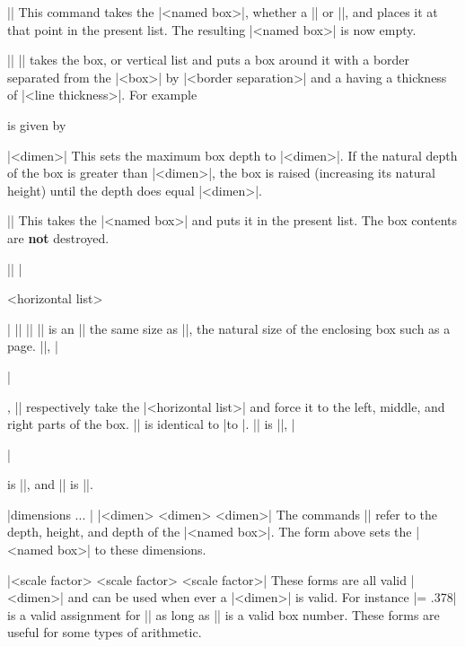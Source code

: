   
\beginblockmode
\pri\@||
\nbr
This command takes the |<named box>|, whether a |\vbox| or
|\hbox|, and places it at that point in the present list. The resulting
|<named box>| is now empty.

\mbr
\ext\@||
\nbr
|\boxit| takes the box, or vertical list and puts a box around it with a
border separated from the |<box>| by |<border separation>| and a having a
thickness of |<line thickness>|. For example

\centerline{}
is given by
\begintt
\centerline{}
\endtt

\mbr
\pri\@|\boxmaxdepth [=] <dimen>|
\nbr
This sets the maximum box depth to |<dimen>|. If the natural depth of the box
is greater than |<dimen>|, the box is raised (increasing its natural height)
until the depth does equal |<dimen>|. 

\mbr
\pri\@||
\nbr
This takes the |<named box>| and puts it in the present list. The box
contents are {\bf not} destroyed.


\mbr
\pla\@||
\nbr
\pla\@|\centerline{<horizontal list>}|
\nbr
\pla\@||
\nbr
\pla\@||
\nbr
|\line| is an |\hbox| the same size as |\hsize|, the natural size of the
enclosing box such as a page. |\leftline|, |\centerline|, |\rightline|
respectively take the |<horizontal list>| and force it to the left, middle,
and right parts of the box. 
|\line| is identical to |\hbox to |. |\leftline| is 
||, |\centerline| is ||, and |\rightline| is ||.

\mbr
\pri\@|\box dimensions ... \dp \ht \wd|
\nbr
\pri\@| <dimen> 
      <dimen> 
      <dimen>|
\nbr
The commands |\dp \ht \wd| refer to the depth, height, and depth of the
|<named box>|. The form above sets the |<named box>| to these dimensions.


\mbr
\pri\@|<scale factor>
     <scale factor>
     <scale factor>|
\nbr
These forms are all valid |<dimen>| and can be used when ever a |<dimen>| is
valid. For instance |\hsize = .378\wd\testbox| is a valid assignment for
|\hsize| as long as |\testbox| is a valid box number. These forms are useful
for some types of arithmetic.


